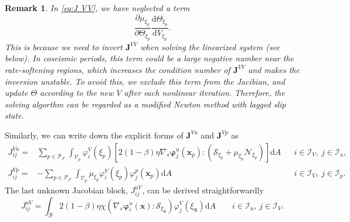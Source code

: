 \documentclass{article}
\newtheorem{remark}{Remark}
\begin{document}
\begin{remark}
  In \eqref{eq:J VV}, we have neglected a term 
  \[
    \frac{\partial\mu_{\xi_p}}{\partial\Theta_{\xi_p}}\frac{\mathrm d\Theta_{\xi_p}}{\mathrm dV_{\xi_p}}.
  \]
  This is because we need to invert $\mathbf J^{VV}$ when solving the linearized system (see below). In coseismic periods, this term could be a large negative number near the rate-softening regions, which increases the condition number of $\mathbf J^{VV}$ and makes the inversion unstable. To avoid this, we exclude this term from the Jacibian, and update $\Theta$ according to the new $V$ after each nonlinear iteration. Therefore, the solving algorthm can be regarded as a modified Newton method with lagged slip state.
\end{remark}

Similarly, we can write down the explicit forms of $\mathbf J^{Vu}$ and $\mathbf J^{Vp}$ as
\begin{align}
  J^{Vu}_{ij} =&\sum_{p\in\mathcal P_{\mathcal F}}\int_{\mathcal V_p}\varphi^V_i(\xi_p)\left[2(1-\beta)\eta\nabla_s\bm\varphi^u_j(\bm x_p) : \left(\bm{\mathcal S}_{\xi_p} + \mu_{\xi_p}\bm{\mathcal N}_{\xi_p}\right)\right]\mathrm dA
  & &i\in\mathcal I_V,~j\in\mathcal I_u,\label{eq:delta X}\\
  J^{Vp}_{ij} =&-\sum_{p\in\mathcal P_{\mathcal F}}\int_{\mathcal V_p}\mu_{\xi_p}\varphi^V_i(\xi_p)\varphi^p_j(\bm x_p)\mathrm dA
  & &i\in\mathcal I_V,~j\in\mathcal I_p.\label{eq:delta V}
\end{align}
The last unknown Jacobian block, $J^{uV}_{ij}$, can be derived straightforwardly
\begin{equation}\label{eq:JuV}
  J^{uV}_{ij} = \int_{\mathcal B}2(1-\beta)\eta\chi\left(\nabla_s\bm\varphi_i^u(\bm x) : \bm{\mathcal S}_{\xi_{\bm x}}\right)\varphi^V_j(\xi_{\bm x})\mathrm dA
  \qquad i\in\mathcal I_u,~j\in\mathcal I_V.
\end{equation}
\end{document}
